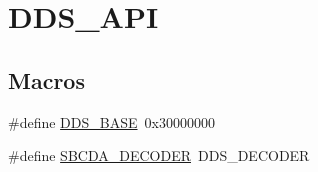 \hypertarget{group___d_d_s___a_p_i}{}\section{D\+D\+S\+\_\+\+A\+PI}
\label{group___d_d_s___a_p_i}
\subsection*{Macros}
\begin{DoxyCompactItemize}
\item 
\#define \hyperlink{group___d_d_s___a_p_i_gaae9812f46efd3711214d66ec5bd90674}{D\+D\+S\+\_\+\+B\+A\+SE}~0x30000000
\item 
\#define \hyperlink{group___d_d_s___a_p_i_ga61f7ba6d9616f3c1b1dd1ac799428fd1}{S\+B\+C\+D\+A\+\_\+\+D\+E\+C\+O\+D\+ER}~D\+D\+S\+\_\+\+D\+E\+C\+O\+D\+ER
\end{DoxyCompactItemize}
